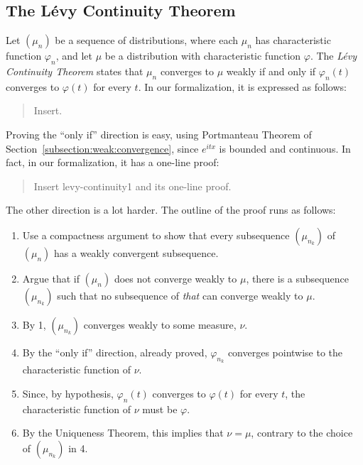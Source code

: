 \documentclass{svjour3}
\newcommand{\todo}[1]{{\color{red}#1}}
\newcommand{\ph}{\varphi}
\begin{document}
\subsection{The L\'evy Continuity Theorem}

Let $(\mu_n)$ be a sequence of distributions, where each $\mu_n$ has characteristic function $\ph_n$, and let $\mu$ be a distribution with characteristic function $\ph$. The \emph{L\'evy Continuity Theorem} states that $\mu_n$ converges to $\mu$ weakly if and only if $\ph_n(t)$ converges to $\ph(t)$ for every $t$. In our formalization, it is expressed as follows:
\begin{quote}
 \todo{Insert.}
\end{quote}

Proving the ``only if'' direction is easy, using Portmanteau Theorem of Section~\ref{subsection:weak:convergence}, since $e^{itx}$ is bounded and continuous. In fact, in our formalization, it has a one-line proof:
\begin{quote}
 \todo{Insert levy-continuity1 and its one-line proof.}
\end{quote}
The other direction is a lot harder. The outline of the proof runs as follows:
\begin{enumerate}
 \item Use a compactness argument to show that every subsequence $(\mu_{n_k})$ of $(\mu_n)$ has a weakly convergent subsequence.
 \item Argue that if $(\mu_n)$ does not converge weakly to $\mu$, there is a subsequence $(\mu_{n_k})$ such that no subsequence of \emph{that} can converge weakly to $\mu$.
 \item By 1, $(\mu_{n_k})$ converges weakly to some measure, $\nu$. 
 \item By the ``only if'' direction, already proved, $\ph_{n_k}$ converges pointwise to the characteristic function of $\nu$.
 \item Since, by hypothesis, $\ph_n(t)$ converges to $\ph(t)$ for every $t$, the characteristic function of $\nu$ must be $\ph$.
 \item By the Uniqueness Theorem, this implies that $\nu = \mu$, contrary to the choice of $(\mu_{n_k})$ in 4.
\end{enumerate}
\end{document}
